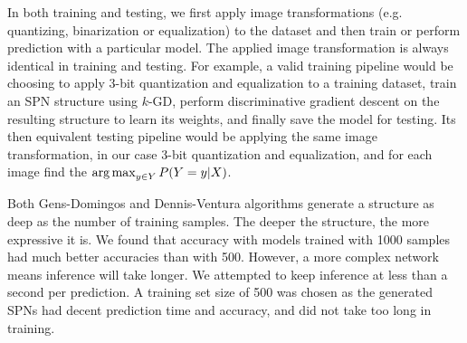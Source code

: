 In both training and testing, we first apply image transformations (e.g. quantizing, binarization
or equalization) to the dataset and then train or perform prediction with a particular model. The
applied image transformation is always identical in training and testing. For example, a valid
training pipeline would be choosing to apply 3-bit quantization and equalization to a training
dataset, train an SPN structure using $k$-GD, perform discriminative gradient descent on the
resulting structure to learn its weights, and finally save the model for testing. Its then
equivalent testing pipeline would be applying the same image transformation, in our case 3-bit
quantization and equalization, and for each image find the $\operatorname*{arg\,max}_{y\in Y} P(Y=y|X)$.

Both Gens-Domingos and Dennis-Ventura algorithms generate a structure as deep as the number of
training samples. The deeper the structure, the more expressive it is. We found that accuracy with
models trained with 1000 samples had much better accuracies than with 500. However, a more complex
network means inference will take longer. We attempted to keep inference at less than a second per
prediction. A training set size of 500 was chosen as the generated SPNs had decent prediction time
and accuracy, and did not take too long in training.


